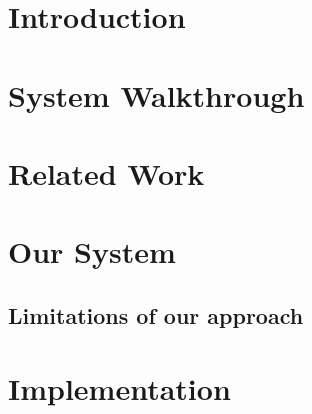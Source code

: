 \cleardoublepage

\chapter{Introduction}



\cleardoublepage
\chapter{System Walkthrough} \label{sec:walkthrough}


\cleardoublepage
\chapter{Related Work}





\cleardoublepage
\chapter{Our System} \label{chap:OurSystem}


\section{Limitations of our approach}\label{sec:limitations}



\cleardoublepage
\chapter{Implementation}

